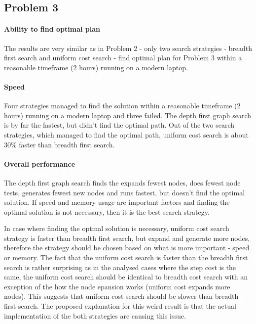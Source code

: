 \documentclass[11pt]{article}
\begin{document}
\subsection{Problem 3}

\paragraph{Ability to find optimal plan}

The results are very similar as in Problem 2 - only two search strategies - breadth first search and uniform cost search - find optimal plan for Problem 3 within a reasonable timeframe (2 hours) running on a modern laptop.

\paragraph{Speed}

Four strategies managed to find the solution within a reasonable timeframe (2 hours) running on a modern laptop and three failed. The depth first graph search is by far the fastest, but didn't find the optimal path. Out of the two search strategies, which managed to find the optimal path, uniform cost search is about 30\% faster than breadth first search. 

\paragraph{Overall performance}

The depth first graph search finds the expands fewest nodes, does fewest node tests, generates fewest new nodes and runs fastest, but doesn't find the optimal solution. If speed and memory usage are important factors and finding the optimal solution is not necessary, then it is the best search strategy.

In case where finding the optmal solution is necessary, uniform cost search strategy is faster than breadth first search, but expand and generate more nodes, therefore the strategy should be chosen based on what is more important - speed or memory. The fact that the uniform cost search is faster than the breadth first search is rather surprising as in the analysed cases where the step cost is the same, the uniform cost search should be identical to breadth cost search with an exception of the how the node epansion works (uniform cost expands more nodes). This suggests that uniform cost search should be slower than breadth first search. The proposed explanation for this weird result is that the actual implementation of the both strategies are causing this issue.
\end{document}
